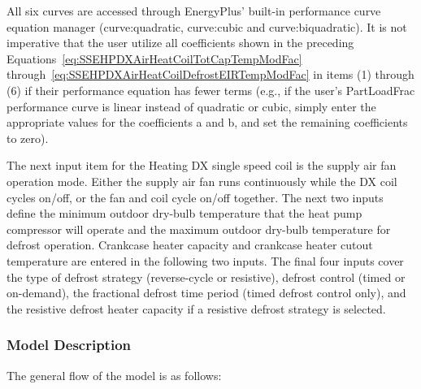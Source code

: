 All six curves are accessed through EnergyPlus' built-in performance curve equation manager (curve:quadratic, curve:cubic and curve:biquadratic). It is not imperative that the user utilize all coefficients shown in the preceding Equations~\ref{eq:SSEHPDXAirHeatCoilTotCapTempModFac} through~\ref{eq:SSEHPDXAirHeatCoilDefrostEIRTempModFac} in items (1) through (6) if their performance equation has fewer terms (e.g., if the user's PartLoadFrac performance curve is linear instead of quadratic or cubic, simply enter the appropriate values for the coefficients a and b, and set the remaining coefficients to zero).

The next input item for the Heating DX single speed coil is the supply air fan operation mode. Either the supply air fan runs continuously while the DX coil cycles on/off, or the fan and coil cycle on/off together. The next two inputs define the minimum outdoor dry-bulb temperature that the heat pump compressor will operate and the maximum outdoor dry-bulb temperature for defrost operation. Crankcase heater capacity and crankcase heater cutout temperature are entered in the following two inputs. The final four inputs cover the type of defrost strategy (reverse-cycle or resistive), defrost control (timed or on-demand), the fractional defrost time period (timed defrost control only), and the resistive defrost heater capacity if a resistive defrost strategy is selected.

\subsubsection{Model Description}\label{model-description-4-001}

The general flow of the model is as follows:

